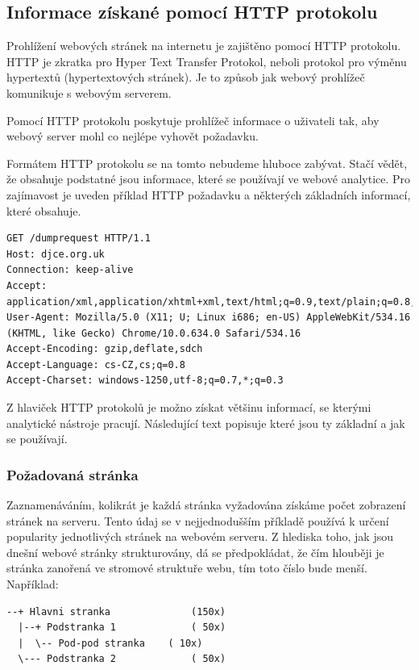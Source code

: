 \documentclass[bc,male,java,dept456]{diploma}						%
\begin{document}
  
\subsection{Informace získané pomocí HTTP protokolu}

Prohlížení webových stránek na internetu je zajištěno pomocí HTTP protokolu. HTTP je zkratka pro Hyper Text Transfer Protokol, neboli protokol pro výměnu hypertextů (hypertextových stránek). Je to způsob jak webový prohlížeč komunikuje s webovým serverem.

Pomocí HTTP protokolu poskytuje prohlížeč informace o uživateli tak, aby webový server mohl co nejlépe vyhovět požadavku.

Formátem HTTP protokolu se na tomto nebudeme hluboce zabývat. Stačí vědět, že obsahuje podstatné jsou informace, které se používají ve webové analytice. Pro zajímavost je uveden příklad HTTP požadavku a některých základních informací, které obsahuje.

\bigskip

\begin{lstlisting}[label=src:Plain,caption=Ukázka HTTP požadavku]
GET /dumprequest HTTP/1.1
Host: djce.org.uk
Connection: keep-alive
Accept: application/xml,application/xhtml+xml,text/html;q=0.9,text/plain;q=0.8,image/png,*/*;q=0.5
User-Agent: Mozilla/5.0 (X11; U; Linux i686; en-US) AppleWebKit/534.16 (KHTML, like Gecko) Chrome/10.0.634.0 Safari/534.16
Accept-Encoding: gzip,deflate,sdch
Accept-Language: cs-CZ,cs;q=0.8
Accept-Charset: windows-1250,utf-8;q=0.7,*;q=0.3
\end{lstlisting}

Z hlaviček HTTP protokolů je možno získat většinu informací, se kterými analytické nástroje pracují. Následující text popisuje které jsou ty základní a jak se používají.

\subsubsection{Požadovaná stránka}

Zaznamenáváním, kolikrát je každá stránka vyžadována získáme počet zobrazení stránek na serveru. Tento údaj se v nejjednodušším příkladě používá k určení popularity jednotlivých stránek na webovém serveru. Z hlediska toho, jak jsou dnešní webové stránky strukturovány, dá se předpokládat, že čím hlouběji je stránka zanořená ve stromové struktuře webu, tím toto číslo bude menší. Například:

\begin{lstlisting}[label=src:Plain,caption=Distribuce návštěv ve stromové struktuře]
--+ Hlavni stranka 				(150x)
  |--+ Podstranka 1				( 50x)
  |  \-- Pod-pod stranka	( 10x)
  \--- Podstranka 2				( 50x)
\end{lstlisting}
\end{document}
